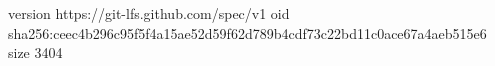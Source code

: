 version https://git-lfs.github.com/spec/v1
oid sha256:ceec4b296c95f5f4a15ae52d59f62d789b4cdf73c22bd11c0ace67a4aeb515e6
size 3404

